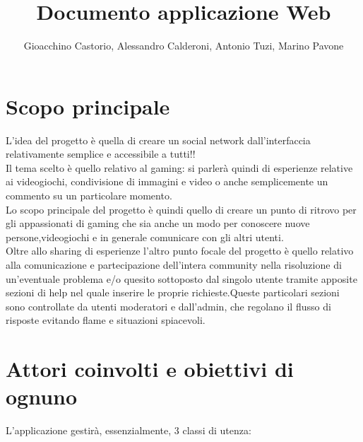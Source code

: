 \documentclass{article}
\begin{document}
  \title{Documento applicazione Web}
  \author{Gioacchino Castorio, Alessandro Calderoni, Antonio Tuzi, Marino Pavone}
  \maketitle

  \section{Scopo principale}

    L'idea del progetto è quella di creare un social network dall'interfaccia relativamente semplice e accessibile a tutti!!\\
    \noindent Il tema scelto è quello relativo al gaming: si parlerà quindi di esperienze relative ai videogiochi, condivisione di immagini e video o anche semplicemente un commento su un particolare momento.\\
    \noindent Lo scopo principale del progetto è quindi quello di creare un punto di ritrovo per gli appassionati di gaming che sia anche un modo per conoscere nuove persone,videogiochi e in generale comunicare con gli altri utenti.\\

    Oltre allo sharing di esperienze l'altro punto focale del progetto è quello relativo alla comunicazione e partecipazione dell'intera community nella risoluzione di un'eventuale problema e/o quesito sottoposto dal singolo utente tramite apposite sezioni di help nel quale inserire le proprie richieste.Queste particolari sezioni sono controllate da utenti moderatori e dall'admin, che regolano il flusso di risposte evitando flame e situazioni spiacevoli.

  \newpage

  \section{Attori coinvolti e obiettivi di ognuno}
  L'applicazione gestirà, essenzialmente, 3 classi di utenza:
\end{document}
